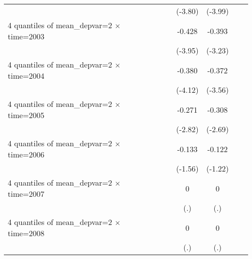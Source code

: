 \begin{table}[htbp]
\begin{tabular}{l*{6}{c}}
                    &                     &                     &     (-3.80)         &     (-3.99)         &                     &                     \\
[1em]
4 quantiles of mean\_depvar=2 $\times$ time=2003&                     &                     &      -0.428\sym{***}&      -0.393\sym{***}&                     &                     \\
                    &                     &                     &     (-3.95)         &     (-3.23)         &                     &                     \\
[1em]
4 quantiles of mean\_depvar=2 $\times$ time=2004&                     &                     &      -0.380\sym{***}&      -0.372\sym{***}&                     &                     \\
                    &                     &                     &     (-4.12)         &     (-3.56)         &                     &                     \\
[1em]
4 quantiles of mean\_depvar=2 $\times$ time=2005&                     &                     &      -0.271\sym{**} &      -0.308\sym{**} &                     &                     \\
                    &                     &                     &     (-2.82)         &     (-2.69)         &                     &                     \\
[1em]
4 quantiles of mean\_depvar=2 $\times$ time=2006&                     &                     &      -0.133         &      -0.122         &                     &                     \\
                    &                     &                     &     (-1.56)         &     (-1.22)         &                     &                     \\
[1em]
4 quantiles of mean\_depvar=2 $\times$ time=2007&                     &                     &           0         &           0         &                     &                     \\
                    &                     &                     &         (.)         &         (.)         &                     &                     \\
[1em]
4 quantiles of mean\_depvar=2 $\times$ time=2008&                     &                     &           0         &           0         &                     &                     \\
                    &                     &                     &         (.)         &         (.)         &                     &                     \\

\end{tabular}
\end{table}
